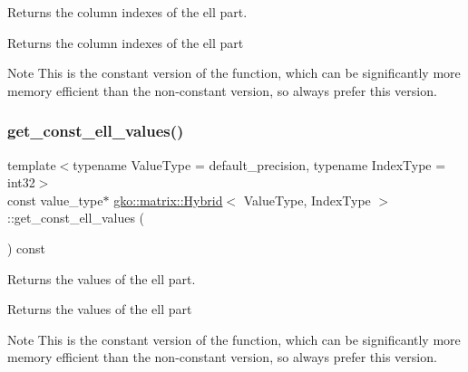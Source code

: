 Returns the column indexes of the ell part. 

\begin{DoxyReturn}{Returns}
the column indexes of the ell part
\end{DoxyReturn}
\begin{DoxyNote}{Note}
This is the constant version of the function, which can be significantly more memory efficient than the non-\/constant version, so always prefer this version. 
\end{DoxyNote}
\mbox{\label{classgko_1_1matrix_1_1Hybrid_af792e702c3650f4e77e8cb256250f21e}} 
\subsubsection{\texorpdfstring{get\+\_\+const\+\_\+ell\+\_\+values()}{get\_const\_ell\_values()}}
{\footnotesize\ttfamily template$<$typename Value\+Type = default\+\_\+precision, typename Index\+Type = int32$>$ \\
const value\+\_\+type$\ast$ \hyperlink{classgko_1_1matrix_1_1Hybrid}{gko\+::matrix\+::\+Hybrid}$<$ Value\+Type, Index\+Type $>$\+::get\+\_\+const\+\_\+ell\+\_\+values (\begin{DoxyParamCaption}{ }\end{DoxyParamCaption}) const\hspace{0.3cm}{\ttfamily [noexcept]}}



Returns the values of the ell part. 

\begin{DoxyReturn}{Returns}
the values of the ell part
\end{DoxyReturn}
\begin{DoxyNote}{Note}
This is the constant version of the function, which can be significantly more memory efficient than the non-\/constant version, so always prefer this version. 
\end{DoxyNote}
\mbox{\label{classgko_1_1matrix_1_1Hybrid_a80eb99775093553db1029b9675f34e2c}} 

